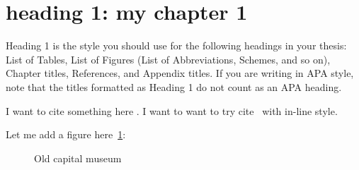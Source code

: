 \section{heading 1: my chapter 1}

Heading 1 is the style you should use for the following headings in your thesis: List of Tables, List of Figures (List of Abbreviations, Schemes, and so on), Chapter titles, References, and Appendix titles. If you are writing in APA style, note that the titles formatted as Heading 1 do not count as an APA heading.

I want to cite something here \parencite{zuo2019standing}. I want to want to try cite~\textcite{zuo2019standing} with in-line style.


Let me add a figure here~\cref{fig:1}:
\begin{figure}[h]
  \centering
  \captionsetup{width=0.6\linewidth} %
  \caption{Old capital museum}
  \label{fig:1}
\end{figure}

